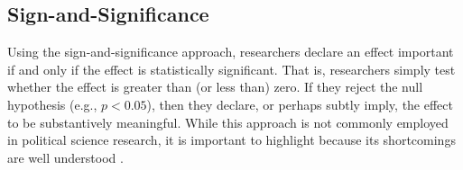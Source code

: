 \documentclass[12pt]{article}
\begin{document}



\subsection*{Sign-and-Significance}

Using the sign-and-significance approach, researchers declare an effect important if and only if the effect is statistically significant. That is, researchers simply test whether the effect is greater than (or less than) zero. If they reject the null hypothesis (e.g., $p < 0.05$), then they declare, or perhaps subtly imply, the effect to be substantively meaningful. While this approach is not commonly employed in political science research, it is important to highlight because its shortcomings are well understood \citep{Gill1999}.
\end{document}
